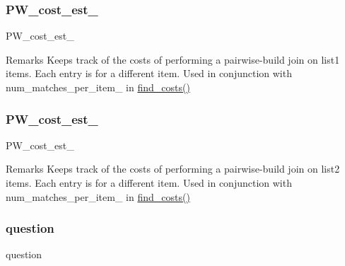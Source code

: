 \subsubsection{\texorpdfstring{P\+W\+\_\+cost\+\_\+est\+\_}{PW\_cost\_est\_1}}
{\footnotesize\ttfamily P\+W\+\_\+cost\+\_\+est\+\_}

\begin{DoxyRemark}{Remarks}
Keeps track of the costs of performing a pairwise-\/build join on list1 items. Each entry is for a different item. Used in conjunction with num\+\_\+matches\+\_\+per\+\_\+item\+\_ in \hyperlink{classdynamicfilterapp_1_1models_1_1_join_ac9cef0d40608117205ed9d5118f5f87c}{find\+\_\+costs()} 
\end{DoxyRemark}
\mbox{\label{classdynamicfilterapp_1_1models_1_1_join_a813429f929973d3f9b0d2f8e7f6b7c23}} 
\subsubsection{\texorpdfstring{P\+W\+\_\+cost\+\_\+est\+\_}{PW\_cost\_est\_2}}
{\footnotesize\ttfamily P\+W\+\_\+cost\+\_\+est\+\_}

\begin{DoxyRemark}{Remarks}
Keeps track of the costs of performing a pairwise-\/build join on list2 items. Each entry is for a different item. Used in conjunction with num\+\_\+matches\+\_\+per\+\_\+item\+\_ in \hyperlink{classdynamicfilterapp_1_1models_1_1_join_ac9cef0d40608117205ed9d5118f5f87c}{find\+\_\+costs()} 
\end{DoxyRemark}
\mbox{\label{classdynamicfilterapp_1_1models_1_1_join_a1a1b6bd27a93f9139a2f44d01f7b3ad1}} 
\subsubsection{\texorpdfstring{question}{question}}
{\footnotesize\ttfamily question}


